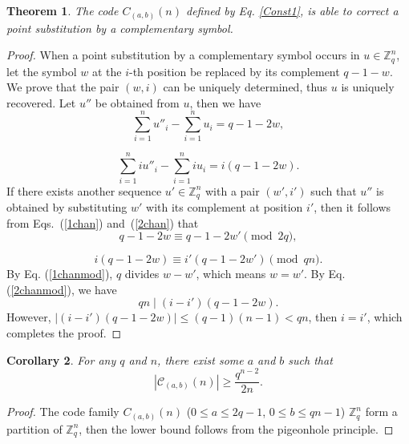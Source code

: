 \documentclass[pdflatex,sn-mathphys-num]{sn-jnl}
\theoremstyle{theorem}%
\newtheorem{theorem}{Theorem}
\newtheorem{corollary}[theorem]{Corollary}
\theoremstyle{definition}
\theoremstyle{construction}
\newtheorem{open problem}{Open problem}
\begin{document}
\begin{theorem}
The code $C_{(a,b)}(n)$ defined by Eq. \eqref{Const1}, is able to correct a point substitution by a complementary symbol.
\end{theorem}
\begin{proof}
When a point substitution by a complementary symbol occurs in $u \in \mathbb{Z}_{q}^{n}$, let the symbol $w$ at the $i$-th position be replaced by its complement $q-1-w$. We prove that the pair $(w,i)$ can be uniquely determined, thus $u$ is uniquely recovered. Let $u''$ be obtained from $u$, then we have
\begin{equation}\label{1chan}
\sum_{i=1}^{n}u''_{i}-\sum_{i=1}^{n}u_{i}=q-1-2w,
\end{equation}

\begin{equation}\label{2chan}
	 \sum_{i=1}^{n}iu''_{i}- \sum_{i=1}^{n}iu_{i}=i(q-1-2w).
\end{equation}
If there exists another sequence $u' \in \mathbb{Z}_{q}^{n}$ with a pair $(w',i')$ such that $u''$ is obtained by substituting $w'$ with its complement at position $i'$, then it follows from Eqs.~(\ref{1chan}) and~(\ref{2chan}) that
\begin{equation}\label{1chanmod}
q-1-2w \equiv q-1-2w'\pmod{2q},
\end{equation}

\begin{equation}\label{2chanmod}
	i(q-1-2w) \equiv i'(q-1-2w')\pmod{qn}.
\end{equation}
By Eq. (\ref{1chanmod}), $q$ divides $w-w'$, which means $w=w'$. By Eq. (\ref{2chanmod}), we have 
\begin{equation}
qn\mid	(i-i')(q-1-2w). 
\end{equation}
However, $\left |  (i-i')(q-1-2w) \right |  \le (q-1)(n-1)<qn$, then $i=i'$, which completes the proof.
\end{proof}
\begin{corollary}\label{cab}
For any $q$ and $n$, there exist some $a$ and $b$ such that $$|\mathcal{C}_{(a,b)}(n)|\ge \displaystyle\frac{q^{n-2}}{2n}.$$
\end{corollary}
\begin{proof}
The code family $C_{(a,b)}(n)$ ($0\le a\le 2q-1$, $0\le b\le qn-1$)  $\mathbb{Z}_{q}^{n}$ form a partition of $\mathbb{Z}_{q}^{n}$, then the lower bound follows from the pigeonhole principle.
\end{proof}
\end{document}
